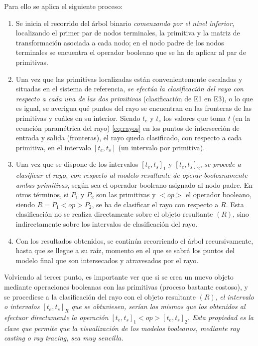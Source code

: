 Para ello se aplica el siguiente proceso: 
\begin{enumerate}
    \item Se inicia el recorrido del árbol binario \textit{comenzando por el nivel inferior}, localizando el primer par de nodos terminales, la primitiva y la matriz de transformación asociada a cada nodo; en el nodo padre de los nodos terminales se encuentra el operador booleano que se ha de aplicar al par de primitivas.
    \item Una vez que las primitivas localizadas están convenientemente escaladas y situadas en el sistema de referencia, \textit{se efectúa la clasificación del rayo con respecto a cada una de las dos primitivas} (clasificación de E1 en E3), o lo que es igual, se averigua qué puntos del rayo se encuentran en las fronteras de las primitivas y cuáles en su interior. Siendo $t_e$ y $t_s$ los valores que toma $t$ (en la ecuación paramétrica del rayo) \ref{eq:rayos} en los puntos de intersección de entrada y salida (fronteras), el rayo queda clasificado, con respecto a cada primitiva, en el intervalo $[t_e, t_s]$ (un intervalo por primitiva).
    \item Una vez que se dispone de los intervalos ${[t_e, t_s]}_1$ y ${[t_e, t_s]}_2$, \textit{se procede a clasificar el rayo, con respecto al modelo resultante de operar booleanamente ambas primitivas}, según sea el operador booleano asignado al nodo padre. En otros términos, si $P_1$ y $P_2$ son las primitivas y $<op>$ el operador booleano, siendo $R = P_1 <op> P_2$, se ha de clasificar el rayo con respecto a $R$. Esta clasificación no se realiza directamente sobre el objeto resultante $(R)$, sino indirectamente sobre los intervalos de clasificación del rayo.
    \item Con los resultados obtenidos, se continúa recorriendo el árbol recursivamente, hasta que se llegue a su raíz, momento en el que se sabrá los puntos del modelo final que son intersecados y atravesados por el rayo.
    
\end{enumerate}

Volviendo al tercer punto, es importante ver que si se crea un nuevo objeto mediante operaciones booleanas con las primitivas (proceso bastante costoso), y se procediese a la clasificación del rayo con el objeto resultante $(R)$, \textit{el intervalo o intervalos ${[t_e, t_s]}_R$ que se obtuviesen, serían los mismos que los obtenidos al efectuar directamente la operación ${[t_e, t_s]}_1 <op> {[t_e, t_s]}_2$. Esta propiedad es la clave que permite que la visualización de los modelos booleanos, mediante ray casting o ray tracing, sea muy sencilla.}


